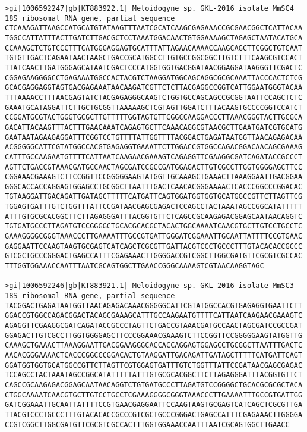 \documentclass[11pt]{article}
\begin{document}
\begin{Verbatim}[commandchars=\\\{\}]
>gi|1006592247|gb|KT883922.1| Meloidogyne sp. GKL-2016 isolate MmSC4 18S ribosomal RNA gene, partial sequence
CTCAAAGATTAAGCCATGCATGTATAAGTTTAATCGCATCAAGCGAGAAACCGCGAACGGCTCATTACAA
TGGCCATTATTTACTTGATCTTGACGCTCCTAAATGGACAACTGTGGAAAAGCTAGAGCTAATACATGCA
CCAAAGCTCTGTCCCTTTCATGGGAGGAGTGCATTTATTAGAACAAAACCAAGCAGCTTCGGCTGTCAAT
TGTGTTGACTCAGAATAACTAAGCTGACCGCATGGCCTTGTGCCGGCGGCTTGTCTTTCAAGCGTCCACT
TTATCAACTTGATGGGAGCATAATCGACTCCCATGGTGGTGACGGATAACGGAGGATAAGGGTTCGACTC
CGGAGAAGGGGCCTGAGAAATGGCCACTACGTCTAAGGATGGCAGCAGGCGCGCAAATTACCCACTCTCG
GCACGAGGAGGTAGTGACGAGAAATAACAAGATCGTTCTCTTACGAGGCCGGTCATTGGAATGGGTACAA
TTTAAAACCTTTAACGAGTATCTACGAGAGGGCAAGTCTGGTGCCAGCAGCCGCGGTAATTCCAGCTCTC
GAAATGCATAGGATTCTTGCTGCGGTTAAAAAGCTCGTAGTTGGATCTTTACAAGTGCCCCGGTCCATCT
CCGGATGCGTACTGGGTGCGCTTGTTTTTGGTAGTGTTCGGCCAAGGACCCTTAAACGGGTACTTGCGCA
GACATTACAAGTTTACTTTGAACAAATCAGAGTGCTTCAAACAGGCGTAACGCTTGAATGATCGTGCATG
GAATAATAGAAGAGGATTTCGGTCCTGTTTTATTGGTTTTACGGACTGAGATAATGGTTAACAGAGACAA
ACGGGGGCATTCGTATGGCCACGTGAGAGGTGAAATTCTTGGACCGTGGCCAGACGGACAACAGCGAAAG
CATTTGCCAAGAATGTTTTCATTAATCAAGAACGAAAGTCAGAGGTTCGAAGGCGATCAGATACCGCCCT
AGTTCTGACCGTAAACGATGCCAACTAGCGATCCGCCGATGGAGACTTGTCGCCTTGGTGGGGAGCTTCC
CGGAAACGAAAGTCTTCCGGTTCCGGGGGAAGTATGGTTGCAAAGCTGAAACTTAAAGGAATTGACGGAA
GGGCACCACCAGGAGTGGAGCCTGCGGCTTAATTTGACTCAACACGGGAAAACTCACCCGGCCCGGACAC
TGTAAGGATTGACAGATTGATAGCTTTTTCATGATTCAGTGGATGGTGGTGCATGGCCGTTCTTAGTTCG
TGGAGTGATTTGTCTGGTTTATTCCGATAACGAGCGAGACTCCAGCCTACTAAATAGCCGGCATATTTTT
ATTTGTGCGCACGGCTTCTTAGAGGGATTTACGGTGTTCTCAGCCGCAAGAGACGGAGCAATAACAGGTC
TGTGATGCCCTTAGATGTCCGGGGCTGCACGCACGCTACACTGGCAAAATCAACGTGCTTGTCCTGCCTC
GAAAGGGGCGGGTAAACCCTTGAAAATTTGCCGTGATTGGGATCGGAAATTGCAATTATTTTCCGTGAAC
GAGGAATTCCAAGTAAGTGCGAGTCATCAGCTCGCGTTGATTACGTCCCTGCCCTTTGTACACACCGCCC
GTCGCTGCCCGGGACTGAGCCATTTCGAGAAACTTGGGGACCGTCGGCTTGGCGATGTTCGCGTCGCCAC
TTTGGTGGAAACCAATTTAATCGCAGTGGCTTGAACCGGGCAAAAGTCGTAACAAGGTAGC

>gi|1006592246|gb|KT883921.1| Meloidogyne sp. GKL-2016 isolate MmSC3 18S ribosomal RNA gene, partial sequence
TACGGACTGAGATAATGGTTAACAGAGACAAACGGGGGCATTCGTATGGCCACGTGAGAGGTGAATTCTT
GGACCGTGGCCAGACGGACTACAGCGAAAGCATTTGCCAAGAATGTTTTCATTAATCAAGAACGAAAGTC
AGAGGTTCGAAGGCGATCAGATACCGCCCTAGTTCTGACCGTAAACGATGCCAACTAGCGATCCGCCGAT
GGAGACTTGTCGCCTTGGTGGGGAGCTTCCCGGAAACGAAAGTCTTCCGGTTCCGGGGGAAGTATGGTTG
CAAAGCTGAAACTTAAAGGAATTGACGGAAGGGCACCACCAGGAGTGGAGCCTGCGGCTTAATTTGACTC
AACACGGGAAAACTCACCCGGCCCGGACACTGTAAGGATTGACAGATTGATAGCTTTTTCATGATTCAGT
GGATGGTGGTGCATGGCCGTTCTTAGTTCGTGGAGTGATTTGTCTGGTTTATTCCGATAACGAGCGAGAC
TCCAGCCTACTAAATAGCCGGCATATTTTTATTTGTGCGCACGGCTTCTTAGAGGGATTTACGGTGTTCT
CAGCCGCAAGAGACGGAGCAATAACAGGTCTGTGATGCCCTTAGATGTCCGGGGCTGCACGCGCGCTACA
CTGGCAAAATCAACGTGCTTGTCCTGCCTCGAAAGGGGCGGGTAAACCCTTGAAAATTTGCCGTGATTGG
GATCGGAAATTGCAATTATTTTCCGTGAACGAGGAATTCCAAGTAAGTGCGAGTCATCAGCTCGCGTTGA
TTACGTCCCTGCCCTTTGTACACACCGCCCGTCGCTGCCCGGGACTGAGCCATTTCGAGAAACTTGGGGA
CCGTCGGCTTGGCGATGTTCGCGTCGCCACTTTGGTGGAAACCAATTTAATCGCAGTGGCTTGAACC


\end{Verbatim}
\end{document}
